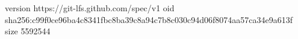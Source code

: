 version https://git-lfs.github.com/spec/v1
oid sha256:c99f0ce96ba4c8341fbc8ba39c8a94c7b8c030c94d06f8074aa57ca34e9a613f
size 5592544
